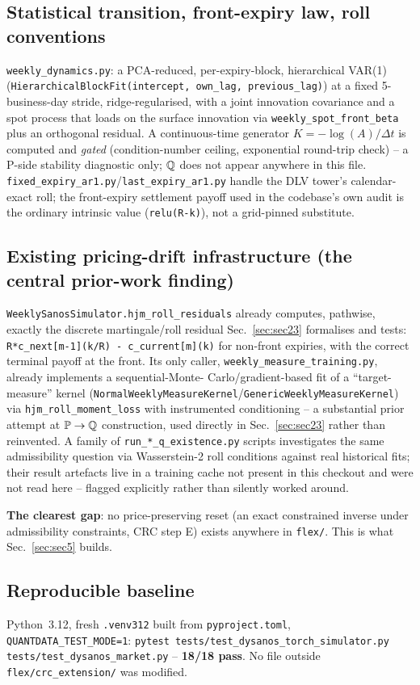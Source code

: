 \subsection{Statistical transition, front-expiry law, roll conventions}

\texttt{weekly\_dynamics.py}: a PCA-reduced, per-expiry-block, hierarchical
VAR(1) (\texttt{HierarchicalBlockFit(intercept, own\_lag, previous\_lag)}) at
a fixed 5-business-day stride, ridge-regularised, with a joint innovation
covariance and a spot process that loads on the surface innovation via
\texttt{weekly\_spot\_front\_beta} plus an orthogonal residual. A
continuous-time generator $K=-\log(A)/\Delta t$ is computed and \emph{gated}
(condition-number ceiling, exponential round-trip check) -- a P-side
stability diagnostic only; $\mathbb Q$ does not appear anywhere in this file.
\texttt{fixed\_expiry\_ar1.py}/\texttt{last\_expiry\_ar1.py} handle the DLV
tower's calendar-exact roll; the front-expiry settlement payoff used in the
codebase's own audit is the ordinary intrinsic value
(\texttt{relu(R-k)}), not a grid-pinned substitute.

\subsection{Existing pricing-drift infrastructure (the central prior-work finding)}

\texttt{WeeklySanosSimulator.hjm\_roll\_residuals} already computes, pathwise,
exactly the discrete martingale/roll residual Sec.~\ref{sec:sec23} formalises
and tests: \texttt{R*c\_next[m-1](k/R) - c\_current[m](k)} for non-front
expiries, with the correct terminal payoff at the front. Its only caller,
\texttt{weekly\_measure\_training.py}, already implements a sequential-Monte-
Carlo/gradient-based fit of a ``target-measure'' kernel
(\texttt{NormalWeeklyMeasureKernel}/\texttt{GenericWeeklyMeasureKernel}) via
\texttt{hjm\_roll\_moment\_loss} with instrumented conditioning -- a
substantial prior attempt at $\mathbb P\to\mathbb Q$ construction, used directly in
Sec.~\ref{sec:sec23} rather than reinvented. A family of
\texttt{run\_*\_q\_existence.py} scripts investigates the same admissibility
question via Wasserstein-2 roll conditions against real historical fits; their
result artefacts live in a training cache not present in this checkout and
were not read here -- flagged explicitly rather than silently worked around.

\textbf{The clearest gap}: no price-preserving reset (an exact constrained
inverse under admissibility constraints, CRC step E) exists anywhere in
\texttt{flex/}. This is what Sec.~\ref{sec:sec5} builds.

\subsection{Reproducible baseline}

Python~3.12, fresh \texttt{.venv312} built from \texttt{pyproject.toml},
\texttt{QUANTDATA\_TEST\_MODE=1}: \texttt{pytest
tests/test\_dysanos\_torch\_simulator.py tests/test\_dysanos\_market.py} --
\textbf{18/18 pass}. No file outside \texttt{flex/crc\_extension/} was
modified.
